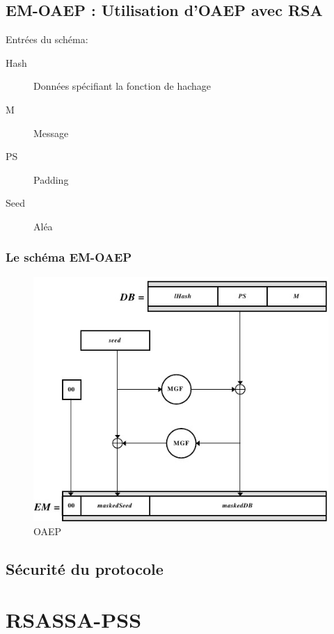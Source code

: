 \documentclass[12pt]{beamer}
\begin{document}
\subsection{EM-OAEP : Utilisation d'OAEP avec RSA}
\begin{frame}
\transwipe
Entrées du schéma:
\begin{description}
\item[Hash] Données spécifiant la fonction de hachage
\item[M] Message
\item[PS] Padding
\item[Seed] Aléa
\end{description}
\frametitle{Le schéma EM-OAEP}
\begin{figure}[H]
\centering
\includegraphics[scale=0.38]{EM-OAEP.png}
\caption{OAEP}
\end{figure}
\end{frame}
\subsection{Sécurité du protocole}
\begin{frame}
\transwipe

\end{frame}
\section{RSASSA-PSS}
\end{document}
